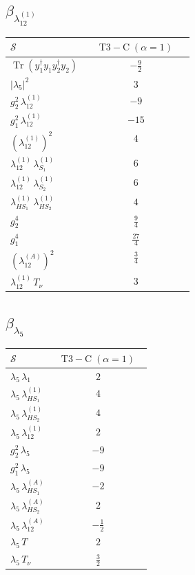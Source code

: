 \documentclass[9pt]{article}
\begin{document}
\subsection*{$ \beta_{\lambda_{12}^{(1)}} $}
\begin{longtable}{@{}p{0.31\linewidth}c@{}}
\toprule
$\mathcal{S}$ & $ \mathrm{T3-C}\;(\alpha=1) $ \\
\midrule
$ \operatorname{Tr}(y_1^\dagger y_1y_2^\dagger y_2) $ & $ - \frac{9}{2} $ \\
$ |\lambda_5|^2 $ & $ 3 $ \\
$ g_2^2\,\lambda_{12}^{(1)} $ & $ -9 $ \\
$ g_1^2\,\lambda_{12}^{(1)} $ & $ -15 $ \\
$ \left(\lambda_{12}^{(1)}\right)^2 $ & $ 4 $ \\
$ \lambda_{12}^{(1)}\,\lambda_{S_1}^{(1)} $ & $ 6 $ \\
$ \lambda_{12}^{(1)}\,\lambda_{S_2}^{(1)} $ & $ 6 $ \\
$ \lambda_{HS_1}^{(1)}\,\lambda_{HS_2}^{(1)} $ & $ 4 $ \\
$ g_2^4 $ & $ \frac{9}{4} $ \\
$ g_1^4 $ & $ \frac{27}{4} $ \\
$ \left(\lambda_{12}^{(A)}\right)^2 $ & $ \frac{3}{4} $ \\
$ \lambda_{12}^{(1)}\,T_\nu $ & $ 3 $ \\
\bottomrule
\end{longtable}
\subsection*{$ \beta_{\lambda_5} $}
\begin{longtable}{@{}p{0.31\linewidth}c@{}}
\toprule
$\mathcal{S}$ & $ \mathrm{T3-C}\;(\alpha=1) $ \\
\midrule
$ \lambda_5\,\lambda_1 $ & $ 2 $ \\
$ \lambda_5\,\lambda_{HS_1}^{(1)} $ & $ 4 $ \\
$ \lambda_5\,\lambda_{HS_2}^{(1)} $ & $ 4 $ \\
$ \lambda_5\,\lambda_{12}^{(1)} $ & $ 2 $ \\
$ g_2^2\,\lambda_5 $ & $ -9 $ \\
$ g_1^2\,\lambda_5 $ & $ -9 $ \\
$ \lambda_5\,\lambda_{HS_1}^{(A)} $ & $ -2 $ \\
$ \lambda_5\,\lambda_{HS_2}^{(A)} $ & $ 2 $ \\
$ \lambda_5\,\lambda_{12}^{(A)} $ & $ - \frac{1}{2} $ \\
$ \lambda_5\,T $ & $ 2 $ \\
$ \lambda_5\,T_\nu $ & $ \frac{3}{2} $ \\
\bottomrule
\end{longtable}
\end{document}
